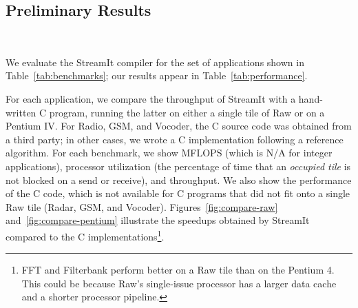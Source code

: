 \subsection{Preliminary Results}
\label{sec:results}

\begin{figure*}[!t]
\centering
\begin{minipage}{3.0in}
\centering
{}
\caption{\protect\small StreamIt throughput on a 16-tile Raw machine,
normalized to throughput of hand-written C running on a single Raw
tile.  \protect\label{fig:compare-raw}}
\end{minipage}
~
\hspace{0.1in}
\begin{minipage}{3.0in}
\centering
{}
\caption{Throughput of StreamIt code running on 16 tiles and C code
running on a single tile, normalized to throughput of C code on a
Pentium IV. \protect\label{fig:compare-pentium}}
\end{minipage}
\end{figure*}

We evaluate the StreamIt compiler for the set of applications shown in
Table~\ref{tab:benchmarks}; our results appear in
Table~\ref{tab:performance}.

For each application, we compare the throughput of StreamIt with a
hand-written C program, running the latter on either a single tile of
Raw or on a Pentium IV.  For Radio, GSM, and Vocoder, the C source
code was obtained from a third party; in other cases, we wrote a C
implementation following a reference algorithm.  For each benchmark,
we show MFLOPS (which is N/A for integer applications), processor
utilization (the percentage of time that an {\it occupied tile} is not
blocked on a send or receive), and throughput.  We also show the
performance of the C code, which is not available for C programs that
did not fit onto a single Raw tile (Radar, GSM, and Vocoder).
Figures~\ref{fig:compare-raw} and~\ref{fig:compare-pentium} illustrate
the speedups obtained by StreamIt compared to the C
implementations\footnote{FFT and Filterbank perform better on a Raw
tile than on the Pentium 4.  This could be because Raw's single-issue
processor has a larger data cache and a shorter processor pipeline.}.

